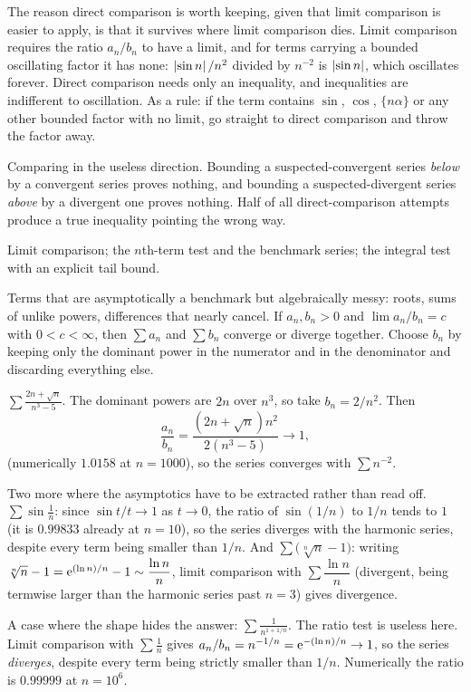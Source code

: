 The reason direct comparison is worth keeping, given that limit comparison is easier to apply, is that it survives where limit comparison dies. Limit comparison requires the ratio $a_n/b_n$ to have a limit, and for terms carrying a bounded oscillating factor it has none: $\left\lvert \sin n\right\rvert/n^2$ divided by $n^{-2}$ is $\left\lvert \sin n\right\rvert$, which oscillates forever. Direct comparison needs only an inequality, and inequalities are indifferent to oscillation. As a rule: if the term contains $\sin$, $\cos$, $\{n\alpha\}$ or any other bounded factor with no limit, go straight to direct comparison and throw the factor away.

\begin{trap}
Comparing in the useless direction. Bounding a suspected-convergent series \emph{below} by a convergent series proves nothing, and bounding a suspected-divergent series \emph{above} by a divergent one proves nothing. Half of all direct-comparison attempts produce a true inequality pointing the wrong way.
\end{trap}

\begin{seealsob}Limit comparison; the $n$th-term test and the benchmark series; the integral test with an explicit tail bound.\end{seealsob}

\cue Terms that are asymptotically a benchmark but algebraically messy: roots, sums of unlike powers, differences that nearly cancel.
\method If $a_n,b_n>0$ and $\lim a_n/b_n=c$ with $0<c<\infty$, then $\sum a_n$ and $\sum b_n$ converge or diverge together. Choose $b_n$ by keeping only the dominant power in the numerator and in the denominator and discarding everything else.

\begin{worked}
$\displaystyle\sum\frac{2n+\sqrt n}{n^3-5}$. The dominant powers are $2n$ over $n^3$, so take $b_n=2/n^2$. Then
\[\frac{a_n}{b_n}=\frac{(2n+\sqrt n)n^2}{2(n^3-5)}\to1,\]
(numerically $1.0158$ at $n=1000$), so the series converges with $\sum n^{-2}$.

Two more where the asymptotics have to be extracted rather than read off. $\displaystyle\sum\sin\frac1n$: since $\sin t/t\to1$ as $t\to0$, the ratio of $\sin(1/n)$ to $1/n$ tends to $1$ (it is $0.99833$ already at $n=10$), so the series diverges with the harmonic series, despite every term being smaller than $1/n$. And $\displaystyle\sum\bigl(\sqrt[n]{n}-1\bigr)$: writing $\sqrt[n]{n}-1=\mathrm{e}^{(\ln n)/n}-1\sim\dfrac{\ln n}{n}$, limit comparison with $\sum\dfrac{\ln n}{n}$ (divergent, being termwise larger than the harmonic series past $n=3$) gives divergence.

A case where the shape hides the answer: $\displaystyle\sum\frac{1}{n^{1+1/n}}$. The ratio test is useless here. Limit comparison with $\sum\tfrac1n$ gives $a_n/b_n=n^{-1/n}=\mathrm{e}^{-(\ln n)/n}\to1$, so the series \emph{diverges}, despite every term being strictly smaller than $1/n$. Numerically the ratio is $0.99999$ at $n=10^6$.
\end{worked}

